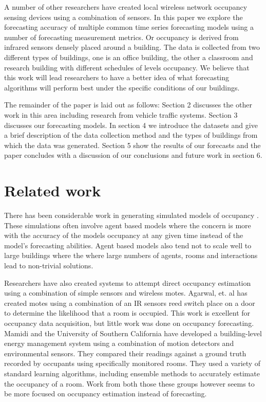\documentclass{acm_proc_article-sp}
\begin{document}
A number of other researchers have created local wireless network occupancy sensing devices using a combination of sensors.  In this paper we explore the forecasting accuracy of multiple common time series forecasting models using a number of forecasting measurement metrics.  Or occupancy is derived from infrared sensors densely placed around a building.  The data is collected from two different types of buildings, one is an office building, the other a classroom and research building with different schedules of levels occupancy.  We believe that this work will lead researchers to have a better idea of what forecasting algorithms will perform best under the specific conditions of our buildings.  

The remainder of the paper is laid out as follows: Section 2 discusses the other work in this area including research from vehicle traffic systems.  Section 3 discusses our forecasting models.  In section 4 we introduce the datasets and give a brief description of the data collection method and the types of buildings from which the data was generated.  Section 5 show the results of our forecasts and the paper concludes with a discussion of our conclusions and future work in section 6.

\section{Related work}
There has been considerable work in generating simulated models of occupancy \cite{PAGE2008, GOLDSTEIN2010}.  These simulations often involve agent based models where the concern is more with the accuracy of the models occupancy at any given time instead of the model's forecasting abilities.   Agent based models also tend not to scale well to large buildings where the where large numbers of agents, rooms and interactions lead to non-trivial solutions.

Researchers have also created systems to attempt direct occupancy estimation using a combination of simple sensors and wireless motes.  Agarwal, et. al \cite{Agarwal2010} has created motes using a combination of an IR sensors reed switch place on a door to determine the likelihood that a room is occupied.  This work is excellent for occupancy data acquisition, but little work was done on occupancy forecasting.  Mamidi \cite{Mamidi2012} and the University of Southern California have developed a building-level energy management system using a combination of motion detectors and environmental sensors.  They compared their readings against a ground truth recorded by occupants using specifically monitored rooms.  They used a variety of standard learning algorithms, including ensemble methods to accurately estimate the occupancy of a room.  Work from both those these groups however seems to be more focused on occupancy estimation instead of forecasting.
\end{document}
